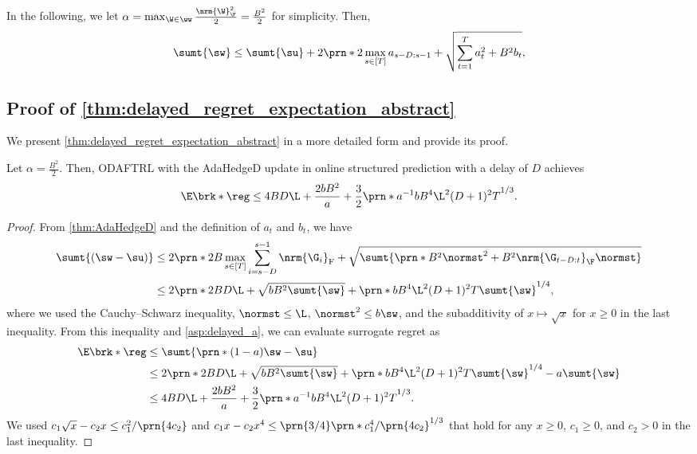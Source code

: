 In the following, we let $\alpha = \max_{\W \in \ww} \frac{\nrm{\W}_\F^2}{2} = \frac{B^2}{2}$ for simplicity. Then,
\begin{equation*}
        \sumt{\sw}
        \leq
        \sumt{\su}
        +
        2\prn*{2\max_{s\in[T]}a_{s-D:s-1}+\sqrt{\sum_{t=1}^{T}a_{t}^2+B^2 b_{t}}},
\end{equation*}


\subsection{Proof of \cref{thm:delayed_regret_expectation_abstract} }
\label{app:sub_delayed_regret_expectation_abstract}
We present \cref{thm:delayed_regret_expectation_abstract} in a more detailed form and provide its proof. 
\begin{theorem}
    \label{thm:delayed_regret_expectation_abstract_detail}
    Let $\alpha=\frac{B^2}{2}$.
    Then, ODAFTRL with the AdaHedgeD update in online structured prediction with a delay of $D$ achieves
    \begin{equation*}
        \E\brk*{\reg}\leq4 B D \L+\frac{2bB^2}{a}
        +\frac{3}{2}\prn*{a^{-1}bB^4\L^2(D+1)^2T}^{1/3}.
    \end{equation*}
\end{theorem}
\begin{proof}
    From \cref{thm:AdaHedgeD} and the definition of $a_t$ and $b_t$, we have
    \begin{align*}
        \sumt{(\sw-\su)}&\leq2\prn*{2B\max_{s\in[T]}\sum_{i=s-D}^{s-1}\nrm{\G_i}_{\mathrm{F}}
        +\sqrt{\sumt{\prn*{B^2\normst^2+B^2\nrm{\G_{t-D:t}}_\F\normst}}}}\\
        &\leq 2\prn*{2BD\L+\sqrt{bB^2\sumt{\sw}}+  \prn*{b B^4 \L^2 (D+1)^2T\sumt{\sw}}^{1/4}},
    \end{align*}
    where we used the Cauchy--Schwarz inequality, $\normst\leq \L$, $\normst^2\leq b\sw$, and the subadditivity of $x \mapsto \sqrt{x}$ for $x \geq 0$ in the last inequality.
    From this inequality and \cref{asp:delayed_a}, we can evaluate surrogate regret as
    \begin{align*}
        \E\brk*{\reg} &\leq \sumt{\prn*{(1-a)\sw-\su}}\\
        &\leq 2\prn*{2BD\L+\sqrt{bB^2\sumt{\sw}} + \prn*{b B^4 \L^2 (D+1)^2 T\sumt{\sw}}^{1/4}} -a\sumt{\sw}\\
        &\leq 4 B D \L+\frac{2bB^2}{a}
        +\frac{3}{2}\prn*{a^{-1}bB^4\L^2(D+1)^2T}^{1/3}.
    \end{align*}
    We used $c_1\sqrt{x}-c_2x\leq{c_1^2}/\prn{4c_2}$ and $c_1x-c_2x^4\leq\prn{{3}/{4}}\prn*{{c_1^4}/\prn{4c_2}}^{1/3}$ that hold for any $x\geq0$, $c_1\geq 0$, and $c_2>0$ in the last inequality.
\end{proof}


